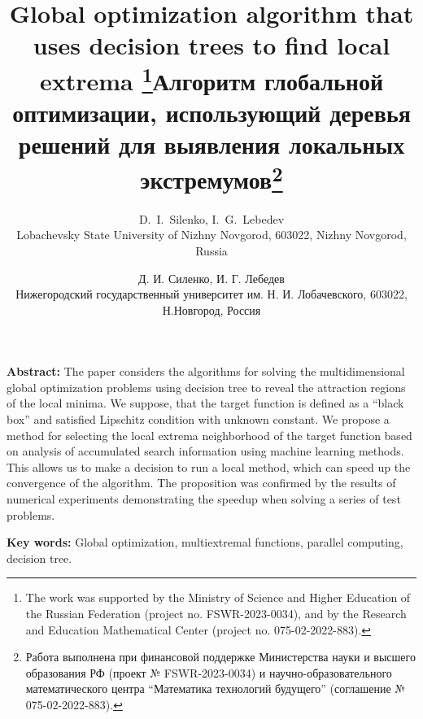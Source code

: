 \documentclass[12pt, a4paper, russian]{article}
\begin{document}

\title{Global optimization algorithm that uses decision trees to find local extrema \thanks{The work was supported by the Ministry of Science and Higher Education of the Russian Federation (project no. FSWR-2023-0034), and by the Research and Education Mathematical Center (project no.  075-02-2022-883).}}

\author{D.~I.~Silenko, I.~G.~Lebedev\\
	\small{Lobachevsky State University of Nizhny Novgorod, 603022, Nizhny Novgorod, Russia}
}
\date{}
\maketitle

\begin{small}
\textbf{Abstract:} The paper considers the algorithms for solving the multidimensional global optimization problems using decision tree to reveal the attraction regions of the local minima. We suppose, that the target function is defined as a “black box” and satisfied Lipschitz condition with unknown constant. We propose a method for selecting the local extrema neighborhood of the target function based on analysis of accumulated search information using machine learning methods. This allows us to make a decision to run a local method, which can speed up the convergence of the algorithm. The proposition was confirmed by the results of numerical experiments demonstrating the speedup when solving a series of test problems.

\textbf{Key words:} Global optimization, multiextremal functions, parallel computing, decision tree.
\end{small}

%
%



\emptythanks
\title{Алгоритм глобальной оптимизации, использующий деревья решений для выявления локальных экстремумов\thanks{Работа выполнена при финансовой поддержке Министерства науки и высшего образования РФ (проект № FSWR-2023-0034) и научно-образовательного математического центра “Математика технологий будущего” (соглашение № 075-02-2022-883).}}

\author{Д. И. Силенко, И. Г. Лебедев\\
	\small{Нижегородский государственный университет им. Н. И. Лобачевского, 603022, Н.Новгород, Россия} 
}
\date{}
\maketitle
\end{document}
